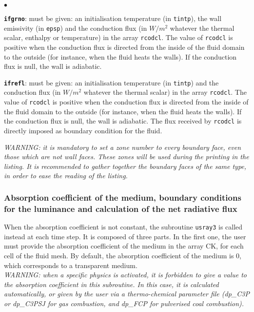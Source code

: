 {{\begin{list}{$\bullet$}{}
\item \texttt{\textbf{ifgrno}}: must be given: an initialisation temperature (in
      \texttt{tintp}), the wall emissivity (in \texttt{epsp}) and the conduction
      flux (in $W/m^2$ whatever the thermal scalar, enthalpy or temperature) in
      the array \texttt{rcodcl}. The value of \texttt{rcodcl} is positive when the
      conduction flux is directed from the inside of the fluid domain to the
      outside (for instance, when the fluid heats the walls). If the
      conduction flux is null, the wall is adiabatic.

\item \texttt{\textbf{ifrefl}}: must be given: an initialisation temperature (in
      \texttt{tintp}) and the conduction flux (in $W/m^2$ whatever the thermal
      scalar) in the array \texttt{rcodcl}. The value of \texttt{rcodcl} is
      positive when the conduction flux is directed from the inside of the
      fluid domain to the outside (for instance, when the fluid heats the
      walls). If the conduction flux is null, the wall is adiabatic. The flux
      received by \texttt{rcodcl} is directly imposed as boundary condition for
      the fluid.

\end{list}

\noindent
{\em WARNING: it is mandatory to set a zone number to every boundary
face, even those which are not wall faces. These zones will be used during the
printing in the listing. It is recommended to gather together the
boundary faces of the same type, in order to ease the reading of the
listing.}\\

\subsubsection{Absorption coefficient of the medium, boundary conditions
   for the luminance and calculation of the net radiative flux}
When the absorption coefficient is not constant, the subroutine \texttt{usray3} is called instead at each time step. It is composed of three parts. In the first one, the user
must provide the absorption coefficient of the medium in the array CK,
for each cell of the fluid mesh. By default, the absorption coefficient
of the medium is 0, which corresponds to a transparent medium.\\

{\em WARNING: when a specific physics is activated, it is forbidden to
give a value to the absorption coefficient in this subroutine. In this
case, it is calculated automatically, or given by the user {\em via} a
thermo-chemical parameter file (dp\_C3P or dp\_C3PSJ for gas combustion,
and dp\_FCP for pulverised coal combustion).}\\

}}
